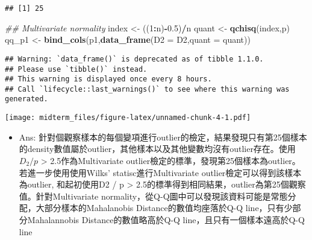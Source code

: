 \documentclass[]{article}
\newenvironment{Shaded}{\begin{snugshade}}{\end{snugshade}}
\newcommand{\CommentTok}[1]{\textcolor[rgb]{0.56,0.35,0.01}{\textit{#1}}}
\newcommand{\DataTypeTok}[1]{\textcolor[rgb]{0.13,0.29,0.53}{#1}}
\newcommand{\DecValTok}[1]{\textcolor[rgb]{0.00,0.00,0.81}{#1}}
\newcommand{\FloatTok}[1]{\textcolor[rgb]{0.00,0.00,0.81}{#1}}
\newcommand{\KeywordTok}[1]{\textcolor[rgb]{0.13,0.29,0.53}{\textbf{#1}}}
\newcommand{\NormalTok}[1]{#1}
\newcommand{\OperatorTok}[1]{\textcolor[rgb]{0.81,0.36,0.00}{\textbf{#1}}}
\newcommand{\StringTok}[1]{\textcolor[rgb]{0.31,0.60,0.02}{#1}}
\providecommand{\tightlist}{%
  \setlength{\itemsep}{0pt}\setlength{\parskip}{0pt}}
\begin{document}
\begin{verbatim}
## [1] 25
\end{verbatim}

\begin{Shaded}
\begin{Highlighting}[]
\CommentTok{## Multivariate normality}
\NormalTok{index <-}\StringTok{  }\NormalTok{((}\DecValTok{1}\OperatorTok{:}\NormalTok{n)}\OperatorTok{-}\FloatTok{0.5}\NormalTok{)}\OperatorTok{/}\NormalTok{n}
\NormalTok{quant <-}\StringTok{ }\KeywordTok{qchisq}\NormalTok{(index,p)}
\NormalTok{qq_p1 <-}\StringTok{ }\KeywordTok{bind_cols}\NormalTok{(p1,}\KeywordTok{data_frame}\NormalTok{(}\DataTypeTok{D2 =}\NormalTok{ D2,}\DataTypeTok{quant =}\NormalTok{ quant))}
\end{Highlighting}
\end{Shaded}

\begin{verbatim}
## Warning: `data_frame()` is deprecated as of tibble 1.1.0.
## Please use `tibble()` instead.
## This warning is displayed once every 8 hours.
## Call `lifecycle::last_warnings()` to see where this warning was generated.
\end{verbatim}

\begin{Shaded}
\end{Shaded}

\texttt{[image: midterm\_files/figure-latex/unnamed-chunk-4-1.pdf]}

\begin{itemize}
\tightlist
\item
  Ans:
  針對個觀察樣本的每個變項進行outlier的檢定，結果發現只有第25個樣本的density數值屬於outlier，其他樣本以及其他變數均沒有outlier存在。使用\(D_2/p\)
  \textgreater{} 2.5作為Multivariate
  outlier檢定的標準，發現第25個樣本為outlier。若進一步使用使用Wilks'
  statisc進行Multivariate outlier檢定可以得到該樣本為outlier,
  和起初使用D2 / p \textgreater{}
  2.5的標準得到相同結果，outlier為第25個觀察值。針對Multivariate
  normality，從Q-Q圖中可以發現該資料可能是常態分配，大部分樣本的Mahalanobis
  Distance的數值均座落於Q-Q line，只有少部分Mahalannobis
  Distance的數值略高於Q-Q line，且只有一個樣本遠高於Q-Q line
\end{itemize}
\end{document}
